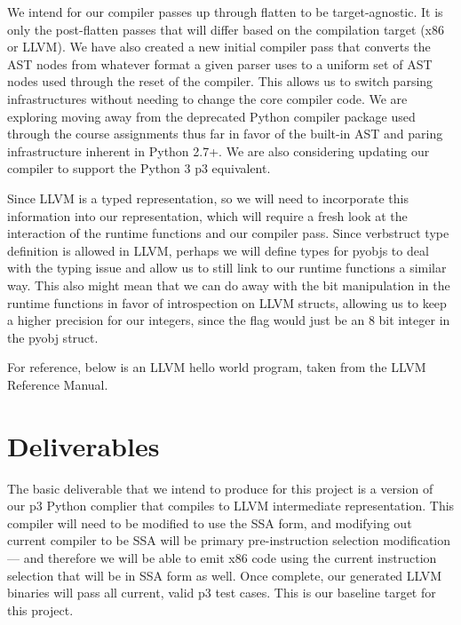 \documentclass[11pt]{article}
\begin{document}
We intend for our compiler passes up through flatten to be
target-agnostic. It is only the post-flatten passes that will differ
based on the compilation target (x86 or LLVM). We have also created a
new initial compiler pass that converts the AST nodes from whatever
format a given parser uses to a uniform set of AST nodes used through
the reset of the compiler. This allows us to switch parsing
infrastructures without needing to change the core compiler code. We are
exploring moving away from the deprecated Python compiler package used
through the course assignments thus far in
favor of the built-in AST and paring infrastructure inherent in Python
2.7+. We are also considering updating our compiler to support the
Python 3 p3 equivalent.

Since LLVM is a typed representation, so we will need to incorporate
this information into our representation, which will require a fresh
look at the interaction of the runtime functions and our compiler
pass. Since verb{struct} type definition is allowed in LLVM, perhaps
we will define types for pyobjs to deal with the typing issue and
allow us to still link to our runtime functions a similar way.  This
also might mean that we can do away with the bit manipulation in the
runtime functions in favor of introspection on LLVM structs, allowing
us to keep a higher precision for our integers, since the flag would
just be an 8 bit integer in the pyobj struct.

For reference, below is an LLVM hello world program, taken from the
LLVM Reference Manual.



\section{Deliverables}

The basic deliverable that we intend to produce for this project is a
version of our p3 Python complier that compiles to LLVM intermediate
representation. This compiler will need to be modified to use the SSA
form, and modifying out current compiler to be SSA will be primary
pre-instruction selection modification --- and therefore we will be
able to emit x86 code using the current instruction selection that
will be in SSA form as well. Once complete, our generated LLVM
binaries will pass all current, valid p3 test cases. This is our
baseline target for this project.
\end{document}
